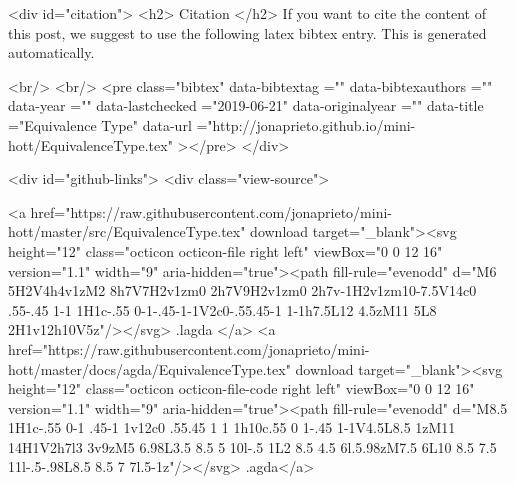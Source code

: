   
  <div id="citation">
  <h2> Citation </h2>
  If you want to cite the content of this post,
  we suggest to use the following latex bibtex entry.
  This is generated automatically.

  <br/>
  <br/>
  <pre class="bibtex"
       data-bibtextag =""
       data-bibtexauthors =""
       data-year =""
       data-lastchecked ="2019-06-21"
       data-originalyear =""
       data-title ="Equivalence Type"
       data-url ="http://jonaprieto.github.io/mini-hott/EquivalenceType.tex"
  ></pre>
  </div>
  

  <div id="github-links">
    <div class="view-source">
      
        <a href="https://raw.githubusercontent.com/jonaprieto/mini-hott/master/src/EquivalenceType.tex" download target="_blank"><svg height="12" class="octicon octicon-file right left" viewBox="0 0 12 16" version="1.1" width="9" aria-hidden="true"><path fill-rule="evenodd" d="M6 5H2V4h4v1zM2 8h7V7H2v1zm0 2h7V9H2v1zm0 2h7v-1H2v1zm10-7.5V14c0 .55-.45 1-1 1H1c-.55 0-1-.45-1-1V2c0-.55.45-1 1-1h7.5L12 4.5zM11 5L8 2H1v12h10V5z"/></svg> .lagda </a>
        <a href="https://raw.githubusercontent.com/jonaprieto/mini-hott/master/docs/agda/EquivalenceType.tex" download target="_blank"><svg height="12" class="octicon octicon-file-code right left" viewBox="0 0 12 16" version="1.1" width="9" aria-hidden="true"><path fill-rule="evenodd" d="M8.5 1H1c-.55 0-1 .45-1 1v12c0 .55.45 1 1 1h10c.55 0 1-.45 1-1V4.5L8.5 1zM11 14H1V2h7l3 3v9zM5 6.98L3.5 8.5 5 10l-.5 1L2 8.5 4.5 6l.5.98zM7.5 6L10 8.5 7.5 11l-.5-.98L8.5 8.5 7 7l.5-1z"/></svg> .agda</a>
      
